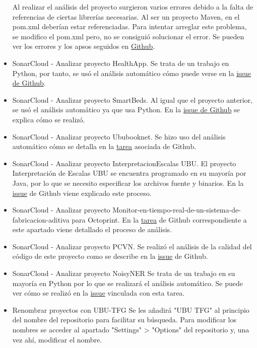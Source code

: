 \begin{itemize}
		Al realizar el análisis del proyecto surgieron varios errores debido a la falta de referencias de ciertas librerías necesarias. Al ser un proyecto Maven, en el pom.xml deberían estar referenciadas. Para intentar arreglar este problema, se modifico el pom.xml pero, no se consiguió solucionar el error. Se pueden ver los errores y los apsos seguidos en \href{https://github.com/dbo1001/Gestor-TFG-2021/issues/154}{Github}.
	\item SonarCloud - Analizar proyecto HealthApp.
		Se trata de un trabajo en Python, por tanto, se usó el análisis automático cómo puede verse en la \href{https://github.com/dbo1001/Gestor-TFG-2021/issues/153}{issue de Github}.
	\item SonarCloud - Analizar proyecto SmartBeds.
		Al igual que el proyecto anterior, se usó el análisis automático ya que usa Python. En la \href{https://github.com/dbo1001/Gestor-TFG-2021/issues/148}{issue de Github} se explica cómo se realizó.
	\item SonarCloud - Analizar proyecto Ububooknet.
		Se hizo uso del análisis automático cómo se detalla en la \href{https://github.com/dbo1001/Gestor-TFG-2021/issues/159}{tarea} asociada de Github.
	\item SonarCloud - Analizar proyecto InterpretacionEscalas UBU.
		El proyecto Interpretación de Escalas UBU se encuentra programado en su mayoría por Java, por lo que se necesito especificar los archivos fuente y binarios. En la \href{https://github.com/dbo1001/Gestor-TFG-2021/issues/163}{issue} de Github viene explicado este proceso.
	\item SonarCloud - Analizar proyecto Monitor-en-tiempo-real-de-un-sistema-de-fabricacion-aditiva para Octoprint.
		En la \href{https://github.com/dbo1001/Gestor-TFG-2021/issues/164}{tarea} de Github correspondiente a este apartado viene detallado el proceso de análisis.
	\item SonarCloud - Analizar proyecto PCVN.
		Se realizó el análisis de la calidad del código de este proyecto como se describe en la \href{https://github.com/dbo1001/Gestor-TFG-2021/issues/162}{issue} de Github.
	\item SonarCloud - Analizar proyecto NoisyNER
		Se trata de un trabajo en su mayoría en Python por lo que se realizará el análisis automático. Se puede ver cómo se realizó en la \href{https://github.com/dbo1001/Gestor-TFG-2021/issues/160}{issue} vinculada con esta tarea.
	\item Renombrar proyectos con UBU-TFG
		Se les añadirá "UBU TFG" al principio del nombre del repositorio para facilitar su búsqueda. Para modificar los nombres se acceder al apartado "Settings" > "Options" del repositorio y, una vez ahí, modificar el nombre.

\end{itemize}
